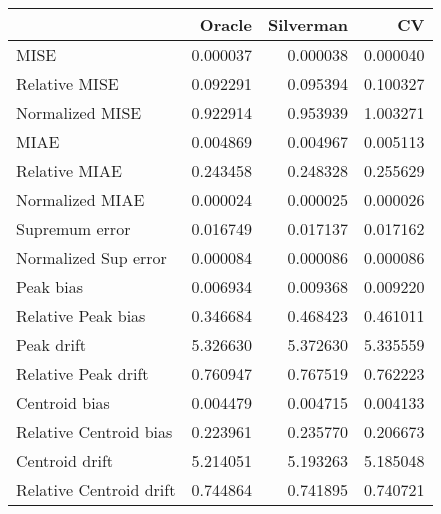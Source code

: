\begin{tabular}{lrrr}
  \toprule
 & Oracle & Silverman & CV \\ 
  \midrule
MISE & 0.000037 & 0.000038 & 0.000040 \\ 
  Relative MISE & 0.092291 & 0.095394 & 0.100327 \\ 
  Normalized MISE & 0.922914 & 0.953939 & 1.003271 \\ 
  MIAE & 0.004869 & 0.004967 & 0.005113 \\ 
  Relative MIAE & 0.243458 & 0.248328 & 0.255629 \\ 
  Normalized MIAE & 0.000024 & 0.000025 & 0.000026 \\ 
  Supremum error & 0.016749 & 0.017137 & 0.017162 \\ 
  Normalized Sup error & 0.000084 & 0.000086 & 0.000086 \\ 
  Peak bias & 0.006934 & 0.009368 & 0.009220 \\ 
  Relative Peak bias & 0.346684 & 0.468423 & 0.461011 \\ 
  Peak drift & 5.326630 & 5.372630 & 5.335559 \\ 
  Relative Peak drift & 0.760947 & 0.767519 & 0.762223 \\ 
  Centroid bias & 0.004479 & 0.004715 & 0.004133 \\ 
  Relative Centroid bias & 0.223961 & 0.235770 & 0.206673 \\ 
  Centroid drift & 5.214051 & 5.193263 & 5.185048 \\ 
  Relative Centroid drift & 0.744864 & 0.741895 & 0.740721 \\ 
   \bottomrule
\end{tabular}
